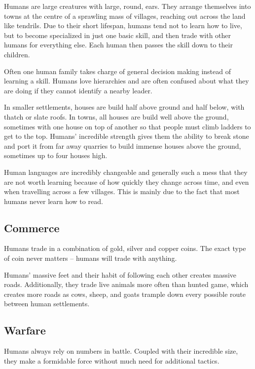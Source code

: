 \begin{multicols}{2}

\noindent
Humans are large creatures with large, round, ears.
They arrange themselves into towns at the centre of a sprawling mass of villages, reaching out across the land like tendrils.
Due to their short lifespan, humans tend not to learn how to live, but to become specialized in just one basic skill, and then trade with other humans for everything else.
Each human then passes the skill down to their children.

Often one human family takes charge of general decision making instead of learning a skill.
Humans love hierarchies and are often confused about what they are doing if they cannot identify a nearby leader.

In smaller settlements, houses are build half above ground and half below, with thatch or slate roofs.
In towns, all houses are build well above the ground, sometimes with one house on top of another so that people must climb ladders to get to the top.
Humans' incredible strength gives them the ability to break stone and port it from far away quarries to build immense houses above the ground, sometimes up to four houses high.

Human languages are incredibly changeable and generally such a mess that they are not worth learning because of how quickly they change across time, and even when travelling across a few villages.
This is mainly due to the fact that most humans never learn how to read.

\subsection{Commerce}

Humans trade in a combination of gold, silver and copper coins.
The exact type of coin never matters -- humans will trade with anything.

Humans' massive feet and their habit of following each other creates massive roads.
Additionally, they trade live animals more often than hunted game, which creates more roads as cows, sheep, and goats trample down every possible route between human settlements.

\subsection{Warfare}
Humans always rely on numbers in battle.
Coupled with their incredible size, they make a formidable force without much need for additional tactics.


\end{multicols}
